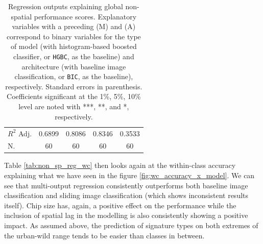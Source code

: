 \begin{table}
\begin{tabular}{lcccc}
$R^2$ Adj.                                        &     0.6899 &           0.8086 &       0.8346 &         0.3533 \\
N.                                                &     60     &           60     &       60     &         60     \\
\bottomrule
\end{tabular}
    \caption{\label{tab:non_sp_reg}\footnotesize Regression outputs explaining
            global non-spatial
    performance scores. Explanatory variables with a preceding (M) and (A)
    correspond to binary variables for the type of model (with histogram-based
            boosted classifier, or \texttt{HGBC}, as the
    baseline) and architecture (with baseline image classification, or
    \texttt{BIC}, as the baseline),
    respectively. Standard errors in parenthesis. Coefficients significant at
    the 1\%, 5\%, 10\% level are noted with ***, **, and *, respectively.}
\end{table}

Table \ref{tab:non_sp_reg_wc} then looks again at the within-class accuracy explaining
what we have seen in the figure \ref{fig:wc_accuracy_x_model}. We can see that
multi-output regression consistently outperforms both baseline image classification and
sliding image classification (which shows inconsistent results itself). Chip size has,
again, a positive effect on the performance while the inclusion of spatial
lag in the modelling is also consistently showing a positive impact. As assumed above, the
prediction of signature types on both extremes of the urban-wild range tends to be
easier than classes in between.

